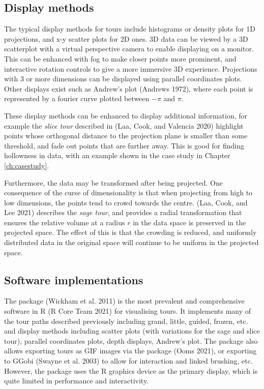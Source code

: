 \hypertarget{display-methods}{%
\subsection{Display methods}\label{display-methods}}

The typical display methods for tours include histograms or density plots for 1D projections, and x-y scatter plots for 2D ones. 3D data can be viewed by a 3D scatterplot with a virtual perspective camera to enable displaying on a monitor. This can be enhanced with fog to make closer points more prominent, and interactive rotation controls to give a more immersive 3D experience. Projections with 3 or more dimensions can be displayed using parallel coordinates plots. Other displays exist such as Andrew's plot (Andrews 1972), where each point is represented by a fourier curve plotted between \(-\pi\) and \(\pi\).

These display methods can be enhanced to display additional information, for example the \emph{slice tour} described in (Laa, Cook, and Valencia 2020) highlight points whose orthogonal distance to the projection plane is smaller than some threshold, and fade out points that are further away. This is good for finding hollowness in data, with an example shown in the case study in Chapter \ref{ch:casestudy}.

Furthermore, the data may be transformed after being projected. One consequence of the curse of dimensionality is that when projecting from high to low dimensions, the points tend to crowd towards the centre. (Laa, Cook, and Lee 2021) describes the \emph{sage tour}, and provides a radial transformation that ensures the relative volume at a radius \(r\) in the data space is preserved in the projected space. The effect of this is that the crowding is reduced, and uniformly distributed data in the original space will continue to be uniform in the projected space.

\hypertarget{software-implementations}{%
\subsection{Software implementations}\label{software-implementations}}

The  package (Wickham et al. 2011) is the most prevalent and comprehensive software in R (R Core Team 2021) for visualising tours. It implements many of the tour paths described previously including grand, little, guided, frozen, etc. and display methods including scatter plots (with variations for the sage and slice tour), parallel coordinates plots, depth displays, Andrew's plot. The package also allows exporting tours as GIF images via the  package (Ooms 2021), or exporting to GGobi (Swayne et al. 2003) to allow for interaction and linked brushing, etc. However, the  package uses the R graphics device as the primary display, which is quite limited in performance and interactivity.

